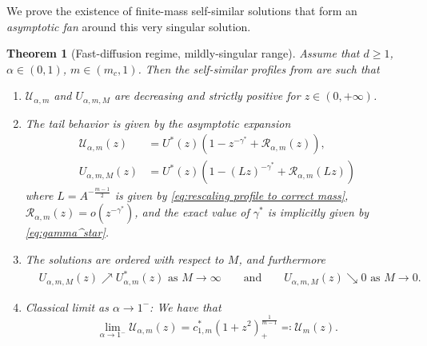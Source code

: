 \documentclass[a4paper]{article}
\newtheorem{theorem}{Theorem}[section]
\theoremstyle{definition}
\begin{document}
%

%

%
%
%
%
%

%
%
%
We prove the existence of finite-mass self-similar solutions that form an \emph{asymptotic fan} around this very singular solution.

\begin{theorem}[Fast-diffusion regime, mildly-singular range]
  \label{thm:fast-diffusion}
  Assume that $d \ge 1$, $\alpha \in (0,1)$, $m \in (m_c, 1)$. Then the self-similar profiles from  are such that
  \begin{enumerate}
    \item $\mathcal U_{\alpha,m}$ and $U_{\alpha,m,M}$ are decreasing and strictly positive for $z \in (0,+\infty)$.

    \item The tail behavior is given by the asymptotic expansion
      \begin{equation}
        \label{eq:fast-diffusion U tail}
        \begin{aligned}
          \mathcal U_{\alpha,m}(z) & = U^*(z) ( 1 - z^{-\gamma^*} + \mathcal R_{\alpha,m}(z)),
          \\
          U_{\alpha,m,M}(z)        & = U^*(z) ( 1 - (Lz)^{-\gamma^*} + \mathcal R_{\alpha,m}(Lz))
        \end{aligned}
      \end{equation}
      where $L = A^{-\frac{m-1}{2}}$ is given by \eqref{eq:rescaling profile to correct mass}, $\mathcal R_{\alpha,m}(z) = o(z^{-\gamma^*})$, and the exact value of $\gamma^*$ is implicitly given by \eqref{eq:gamma^star}.
    \item The solutions are ordered with respect to $M$, and furthermore
      \begin{align*}
        & U_{\alpha,m,M}(z) \nearrow U_{\alpha,m}^*(z) \text{ as } M \to \infty
        \qquad \text{and} \qquad
        U_{\alpha,m,M}(z) \searrow 0 \text{ as } M \to 0.
      \end{align*}
    \item Classical limit as $\alpha \to 1^-$: We have that
      \begin{equation}
        \label{eq:m<1 alpha->1}
        \lim_{\alpha \to 1^-}\mathcal U_{\alpha,m} (z) = c^*_{1,m} (1+z^2)_+ ^{\frac 1 {m-1}} \eqqcolon \mathcal U_{m}(z).
      \end{equation}
  \end{enumerate}
\end{theorem}
\end{document}
